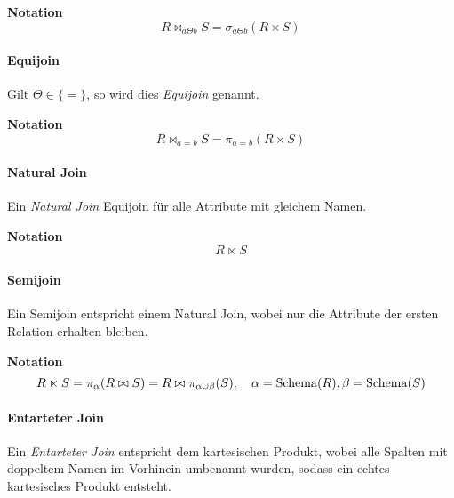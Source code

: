 					\textbf{Notation}
					\begin{equation*}
						R \bowtie _ { a \Theta b } S = \sigma _ { a \Theta b } (R \times S)
					\end{equation*}

				\paragraph{Equijoin} %
					Gilt \( \Theta \in \{=\} \), so wird dies \textit{Equijoin} genannt.

					\textbf{Notation}
					\begin{equation*}
						R \bowtie _ { a = b } S = \pi _ { a = b } (R \times S)
					\end{equation*}

				\paragraph{Natural Join} %
					Ein \textit{Natural Join} Equijoin für alle Attribute mit gleichem Namen.

					\textbf{Notation}
					\begin{equation*}
						R \bowtie S
					\end{equation*}

				\paragraph{Semijoin} %
					Ein Semijoin entspricht einem Natural Join, wobei nur die Attribute der ersten Relation erhalten bleiben.

					\textbf{Notation}
					\begin{equation*}
						R \ltimes S = \pi_\alpha(R \bowtie S) = R \bowtie \pi_{\alpha \cup \beta} (S), \quad \alpha = \operatorname{Schema}(R), \beta = \operatorname{Schema}(S)
					\end{equation*}

				\paragraph{Entarteter Join} %
					Ein \textit{Entarteter Join} entspricht dem kartesischen Produkt, wobei alle Spalten mit doppeltem Namen im Vorhinein umbenannt wurden, sodass ein echtes kartesisches Produkt entsteht.

